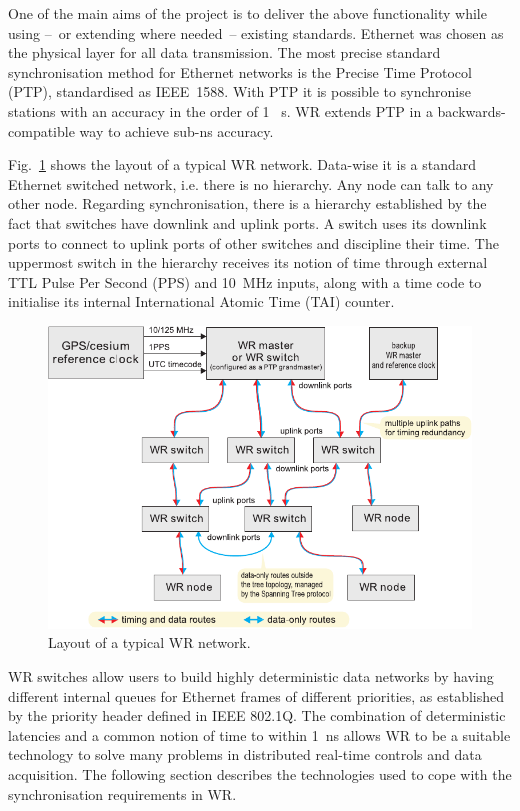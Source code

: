 \documentclass{../JAC2003}
\begin{document}
One of the main aims of the project is to deliver the above
functionality while using --~or extending where needed~-- existing
standards. Ethernet was chosen as the physical layer for all data
transmission. The most precise standard synchronisation method for
Ethernet networks is the Precise Time Protocol (PTP), standardised as
IEEE~1588. With PTP it is possible to synchronise stations with an
accuracy in the order of 1~ \textmu s. WR extends PTP in a
backwards-compatible way to achieve sub-ns accuracy.

Fig.~\ref{hierarchy-fig} shows the layout of a typical WR
network. Data-wise it is a standard Ethernet switched network,
i.e. there is no hierarchy. Any node can talk to any other
node. Regarding synchronisation, there is a hierarchy established by
the fact that switches have downlink and uplink ports. A switch uses
its downlink ports to connect to uplink ports of other switches and
discipline their time. The uppermost switch in the hierarchy receives
its notion of time through external TTL Pulse Per Second (PPS) and
10~MHz inputs, along with a time code to initialise its internal
International Atomic Time (TAI) counter.  

\begin{figure}[htb]
   \centering
   \includegraphics*[width=\columnwidth]{network/hierarchy.pdf}
   \caption{Layout of a typical WR network.}
   \label{hierarchy-fig}
\end{figure}

WR switches allow users to build highly deterministic data networks by
having different internal queues for Ethernet frames of different
priorities, as established by the priority header defined in IEEE
802.1Q. The combination of deterministic latencies and a common notion
of time to within 1~ns allows WR to be a suitable technology to solve
many problems in distributed real-time controls and data
acquisition. The following section describes the technologies used to
cope with the synchronisation requirements in WR.
\end{document}
